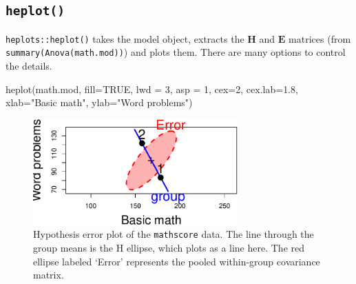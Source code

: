 \documentclass[
  letterpaper,
  10pt,
  krantz2]{krantz}
\makeatletter
\newenvironment{Shaded}{\begin{snugshade}}{\end{snugshade}}
\newcommand{\AttributeTok}[1]{\textcolor[rgb]{0.40,0.45,0.13}{#1}}
\newcommand{\CommentTok}[1]{\textcolor[rgb]{0.37,0.37,0.37}{#1}}
\newcommand{\ConstantTok}[1]{\textcolor[rgb]{0.56,0.35,0.01}{#1}}
\newcommand{\DecValTok}[1]{\textcolor[rgb]{0.68,0.00,0.00}{#1}}
\newcommand{\FloatTok}[1]{\textcolor[rgb]{0.68,0.00,0.00}{#1}}
\newcommand{\FunctionTok}[1]{\textcolor[rgb]{0.28,0.35,0.67}{#1}}
\newcommand{\NormalTok}[1]{\textcolor[rgb]{0.00,0.23,0.31}{#1}}
\newcommand{\OtherTok}[1]{\textcolor[rgb]{0.00,0.23,0.31}{#1}}
\newcommand{\SpecialCharTok}[1]{\textcolor[rgb]{0.37,0.37,0.37}{#1}}
\newcommand{\StringTok}[1]{\textcolor[rgb]{0.13,0.47,0.30}{#1}}
\newenvironment{kframe}{%
  \medskip{}
  \setlength{\fboxsep}{.8em}
  \def\at@end@of@kframe{}%
  \ifinner\ifhmode%
  \def\at@end@of@kframe{\end{minipage}}%
  \begin{minipage}{\columnwidth}%
  \fi\fi%
  \def\FrameCommand##1{\hskip\@totalleftmargin \hskip-\fboxsep
  \colorbox{shadecolor}{##1}\hskip-\fboxsep
      \hskip-\linewidth \hskip-\@totalleftmargin \hskip\columnwidth}%
  \MakeFramed {\advance\hsize-\width
    \@totalleftmargin\z@ \linewidth\hsize
    \@setminipage}}%
{\par\unskip\endMakeFramed%
  \at@end@of@kframe}
\renewenvironment{Shaded}{\begin{kframe}}{\end{kframe}}
\makeatother
\begin{document}
\begin{Shaded}
\end{Shaded}

\hypertarget{heplot}{%
\subsection{\texorpdfstring{\texttt{heplot()}}{heplot()}}\label{heplot}}

\texttt{heplots::heplot()} takes the model object, extracts the
\(\mathbf{H}\) and \(\mathbf{E}\) matrices (from
\texttt{summary(Anova(math.mod))}) and plots them. There are many
options to control the details.

\begin{Shaded}
\begin{Highlighting}[]
\FunctionTok{heplot}\NormalTok{(math.mod, }
       \AttributeTok{fill=}\ConstantTok{TRUE}\NormalTok{, }\AttributeTok{lwd =} \DecValTok{3}\NormalTok{,}
       \AttributeTok{asp =} \DecValTok{1}\NormalTok{,}
       \AttributeTok{cex=}\DecValTok{2}\NormalTok{, }\AttributeTok{cex.lab=}\FloatTok{1.8}\NormalTok{,}
       \AttributeTok{xlab=}\StringTok{"Basic math"}\NormalTok{, }\AttributeTok{ylab=}\StringTok{"Word problems"}\NormalTok{)}
\end{Highlighting}
\end{Shaded}

\begin{figure}[H]

{\centering \includegraphics[width=0.7\textwidth,height=\textheight]{figs/fig-mathscore-HE-1.pdf}

}

\caption{\label{fig-mathscore-HE}Hypothesis error plot of the
\texttt{mathscore} data. The line through the group means is the H
ellipse, which plots as a line here. The red ellipse labeled `Error'
represents the pooled within-group covariance matrix.}

\end{figure}
\end{document}
